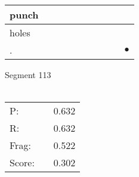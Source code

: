 \documentclass[landscape]{article}
\newcommand{\ssp}{\hspace{2pt}}
\newcommand{\mex}{\cellcolor{g}$\bullet$}
\begin{document}
\begin{tabular}{|l|p{10pt}|p{10pt}|p{10pt}|p{10pt}|p{10pt}|p{10pt}|p{10pt}|p{10pt}|p{10pt}|}
\hline
\ssp punch \ssp&\hspace{2pt}&\hspace{2pt}&\hspace{2pt}&\hspace{2pt}&\hspace{2pt}&\hspace{2pt}&\hspace{2pt}&\hspace{2pt}&\hspace{2pt}\\
\hline
\ssp holes \ssp&\hspace{2pt}&\hspace{2pt}&\hspace{2pt}&\hspace{2pt}&\hspace{2pt}&\hspace{2pt}&\hspace{2pt}&\hspace{2pt}&\hspace{2pt}\\
\hline
\ssp \cellcolor{ref8}. \ssp&\hspace{2pt}&\hspace{2pt}&\hspace{2pt}&\hspace{2pt}&\hspace{2pt}&\hspace{2pt}&\hspace{2pt}&\hspace{2pt}&\hspace{2pt}\mex\\
\hline
\end{tabular}

\vspace{6pt}
\noindent Segment 113\\\\
\noindent\begin{tabular}{lm{12pt}r}
\hline
P:&&0.632\\
R:&&0.632\\
Frag:&&0.522\\
Score:&&0.302\\
\end{tabular}

\newpage
\end{document}

